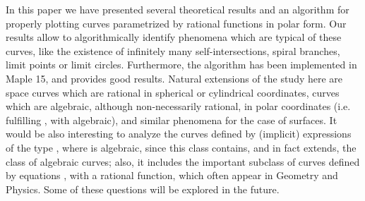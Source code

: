 \documentclass{elsart}
\begin{document}
In this paper we have presented several theoretical results and an algorithm for properly plotting curves parametrized by rational functions in polar form. Our results allow to algorithmically identify phenomena which are typical of these curves, like the existence of infinitely many self-intersections, spiral branches, limit points or limit circles. Furthermore, the algorithm
has been implemented in Maple 15, and provides good results. Natural extensions of the study here are space curves which are rational in spherical or cylindrical coordinates, curves which are algebraic, although non-necessarily rational, in polar coordinates (i.e. fulfilling , with  algebraic), and similar phenomena for the case of surfaces. It would be also interesting to analyze the curves defined by (implicit) expressions
of the type , where  is algebraic, since this class contains, and in fact extends, the class of algebraic curves; also, it includes the important subclass of curves defined by equations , with  a rational function, which often appear in Geometry and Physics. Some of these questions will be explored in the future.
\end{document}
